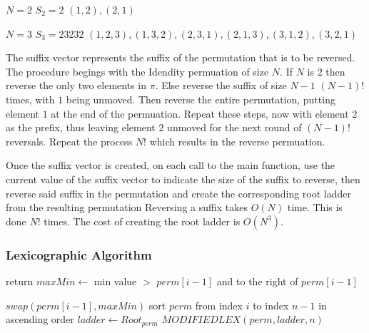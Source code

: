 \begin{example}
  \begin{center}


  $N=2$\newline
  $S_{2} = 2$\newline
  $(1,2), (2,1)$\newline

  $N=3$\newline
  $S_{3} = 23232$\newline 
  $(1,2,3), (1,3,2), (2,3,1), (2,1,3), (3,1,2), (3,2,1)$\newline
  \end{center}
\end{example}
The suffix vector represents the suffix of the permutation that is to 
be reversed. The procedure begings with the Idendity permuation of 
size $N$. If $N$ is $2$ then reverse the only two elements in $\pi$.
Else reverse the suffix of size $N-1$ $(N-1)!$ times, with $1$ being unmoved.
Then reverse the entire permutation, putting element $1$ at the end of the permuation.
Repeat these steps, now with element $2$ as the prefix, thus leaving element 
$2$ unmoved for the next round of $(N-1)!$ reversals. Repeat the process 
$N!$ which results in the reverse permuation.\par 
Once the suffix vector is created, on each call to the main function, use 
the current value of the suffix vector to indicate the size of the suffix to 
reverse, then reverse said suffix in the permutation and create the corresponding root ladder 
from the resulting permutation Reversing a suffix takes $O(N)$ time. This is done $N!$ times.
The cost of creating the root ladder is $O(N^{3})$.



\subsubsection{Lexicographic Algorithm}

\begin{algorithm}
  \begin{algorithmic}[1]
        \State return
      \EndIf
          \State $maxMin \gets $ min value $>$ $perm[i-1]$ and to the right of 
          $perm[i-1]$
          
                                  
          \State $swap(perm[i-1], maxMin)$
          \State sort $perm$ from index $i$ to index $n-1$ in ascending order
          \State $ladder \gets Root_{perm}$
          \State $MODIFIEDLEX(perm, ladder, n)$
        \EndIf
      \EndFor

    \EndFunction
  \end{algorithmic}
\end{algorithm}

